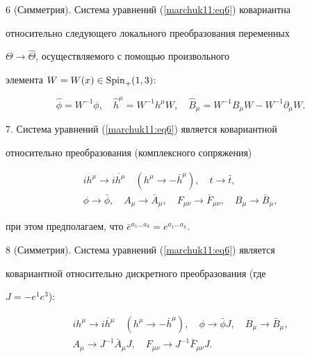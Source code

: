 6 (Симметрия). Система уравнений (\ref{marchuk11:eq6}) ковариантна

относительно следующего локального преобразования переменных

$\Theta\to\hat\Theta$,  осуществляемого с помощью произвольного

элемента $W=W(x)\in{\rm Spin}_+(1, 3)$:

$$

\hat\phi=W^{-1}\phi, \quad \hat h^\mu=W^{-1}h^\mu W, \quad \hat

B_\mu=W^{-1}B_\mu W-W^{-1}\partial_\mu W.

$$



\smallskip



7. Система уравнений (\ref{marchuk11:eq6}) является ковариантной

относительно преобразования (комплексного сопряжения)

\begin{gather*}

i h^\mu\to\overline{i h^\mu}\quad (h^\mu\to-\bar h^\mu),  \quad

 t\to\bar t, \\

\phi\to\bar\phi, \quad A_\mu\to\bar A_\mu, \quad F_{\mu\nu}\to\bar

F_{\mu\nu}, \quad B_\mu\to\bar B_\mu, 

\end{gather*}

при этом предполагаем,  что $\bar e^{a_1\ldots a_k}=e^{a_1\ldots

a_k}$.



\smallskip



8 (Симметрия). Система уравнений (\ref{marchuk11:eq6}) является

ковариантной относительно дискретного преобразования (где

$J=-e^1e^3$):

\begin{gather*}

i h^\mu\to\overline{i h^\mu}\quad (h^\mu\to-\bar h^\mu),  \quad

\phi\to\bar\phi J, \quad B_\mu\to\bar B_\mu, \\

A_\mu\to J^{-1}\bar A_\mu J, \quad F_{\mu\nu}\to J^{-1}\bar

F_{\mu\nu}J.

\end{gather*}







